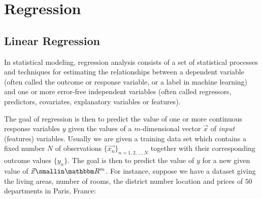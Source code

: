 \section{Regression}

\subsection{Linear Regression}

In statistical modeling, regression analysis consists of a set of statistical processes and techniques for estimating the relationships between a dependent variable (often called the outcome or response variable, or a label in machine learning) and one or more error-free independent variables (often called regressors, predictors, covariates, explanatory variables or features). 

The goal of regression is then to predict the value of one or more continuous response variables $y$ given the values of a $m$-dimensional vector $\vec{x}$ of \emph{input} (features) variables. Usually we are given a training data set which contains a fixed number $N$ of observations $\{\vec{x_n}\}_{n=1,2,...,N}$ together with their corresponding outcome values $\{y_n\}$. The goal is then to predict the value of $y$ for a new given value of $\vec{x} \in \RR^{m}$. For instance, suppose we have a dataset giving the living areas, number of rooms, the district number location and prices of $50$ departments in Paris, France: \\

